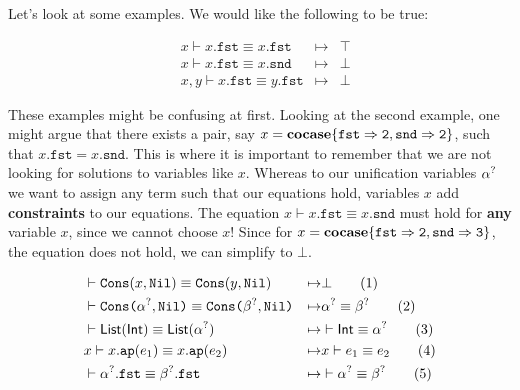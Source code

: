 \documentclass[twoside,12pt,a4paper]{article}
\begin{document}
Let's look at some examples. We would like the following to be true:
\begin{example}
    \begin{align*}
    &x \vdash x.\mathtt{fst} \equiv x.\mathtt{fst} &\mapsto& \top
    \\
    &x \vdash x.\mathtt{fst} \equiv x.\mathtt{snd} &\mapsto& \bot 
    \\
    &x,y \vdash x.\mathtt{fst} \equiv y.\mathtt{fst} &\mapsto& \bot 
    \end{align*}
\end{example}
These examples might be confusing at first. Looking at the second example, one might argue that there exists a pair, say $x = \textbf{cocase}\{\mathtt{fst\Rightarrow 2, snd\Rightarrow 2}\}$, such that
$x.\mathtt{fst} = x.\mathtt{snd}$. This is where it is important to remember that we are not looking for solutions to variables like $x$.
Whereas to our unification variables $\alpha^?$ we want to assign any term such that our equations hold, variables $x$ add \textbf{constraints} to our equations. 
The equation $x \vdash x.\mathtt{fst} \equiv x.\mathtt{snd}$ must hold for \textbf{any} variable $x$, since we cannot choose $x$! 
Since for $x = \textbf{cocase}\{\mathtt{fst\Rightarrow 2, snd\Rightarrow 3}\}$, the equation does not hold, we can simplify to $\bot$.

\begin{example}
    \begin{align*}
    &\vdash \mathtt{Cons(}x, \mathtt{Nil}\mathtt{)} \equiv \mathtt{Cons(}y, \mathtt{Nil}\mathtt{)}&\mapsto& \bot
    \tag{1}\\
    &\vdash \texttt{Cons(}\alpha^?, \texttt{Nil)}\equiv\texttt{Cons(}\beta^?, \texttt{Nil)}
    &\mapsto&\alpha^?\equiv \beta^?
    \tag{2}\\
    &\vdash \mathsf{List(Int)}\equiv \mathsf{List(\alpha^?)}
    &\mapsto& \vdash \mathsf{Int}\equiv \alpha^?
    \tag{3}\\
    &x \vdash x.\texttt{ap}(e_1)\equiv x.\texttt{ap}(e_2) &\mapsto& x\vdash e_1\equiv e_2 
    \tag{4}\\
    &\vdash\mathtt{\alpha^?.fst \equiv \beta^?.fst}&\mapsto& \vdash\alpha^?\equiv \beta^?
    \tag{5}
    \end{align*}
\end{example}
\end{document}

